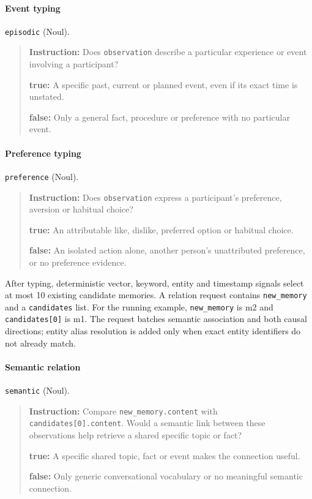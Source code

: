 \documentclass[11pt]{article}
\begin{document}
\paragraph{Event typing} \texttt{episodic} (Noul).
\begin{quote}\small
\noindent\textbf{Instruction:} Does \texttt{observation} describe a particular experience or event involving a participant?\par
\noindent\textbf{true:} A specific past, current or planned event, even if its exact time is unstated.\par
\noindent\textbf{false:} Only a general fact, procedure or preference with no particular event.\par
\end{quote}

\paragraph{Preference typing} \texttt{preference} (Noul).
\begin{quote}\small
\noindent\textbf{Instruction:} Does \texttt{observation} express a participant's preference, aversion or habitual choice?\par
\noindent\textbf{true:} An attributable like, dislike, preferred option or habitual choice.\par
\noindent\textbf{false:} An isolated action alone, another person's unattributed preference, or no preference evidence.\par
\end{quote}

After typing, deterministic vector, keyword, entity and timestamp signals select at most 10 existing candidate memories. A relation request contains \texttt{new\_memory} and a \texttt{candidates} list. For the running example, \texttt{new\_memory} is m2 and \texttt{candidates[0]} is m1. The request batches semantic association and both causal directions; entity alias resolution is added only when exact entity identifiers do not already match.

\paragraph{Semantic relation} \texttt{semantic} (Noul).
\begin{quote}\small
\noindent\textbf{Instruction:} Compare \texttt{new\_memory.content} with \texttt{candidates[0].content}. Would a semantic link between these observations help retrieve a shared specific topic or fact?\par
\noindent\textbf{true:} A specific shared topic, fact or event makes the connection useful.\par
\noindent\textbf{false:} Only generic conversational vocabulary or no meaningful semantic connection.\par
\end{quote}
\end{document}
